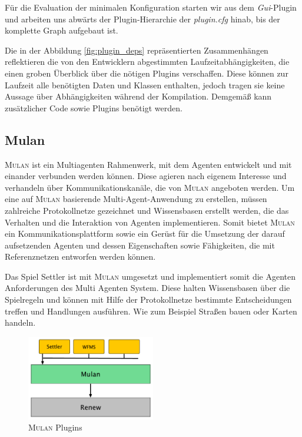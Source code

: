 	Für die Evaluation der minimalen Konfiguration starten wir aus dem \textit{Gui}-Plugin und arbeiten uns abwärts der Plugin-Hierarchie der \textit{plugin.cfg} hinab, bis der komplette Graph aufgebaut ist.\newline

	Die in der Abbildung \ref{fig:plugin_deps} repräsentierten Zusammenhängen reflektieren die von den Entwicklern abgestimmten Laufzeitabhängigkeiten, die einen groben Überblick über die nötigen Plugins verschaffen. Diese können zur Laufzeit alle benötigten Daten und Klassen enthalten, jedoch tragen sie keine Aussage über Abhängigkeiten während der Kompilation. Demgemäß kann zusätzlicher Code sowie Plugins benötigt werden. 


\subsection{Mulan} \label{sub:mulan}
	\textsc{Mulan} \cite{Roelke04} ist ein Multiagenten Rahmenwerk, mit dem Agenten entwickelt und mit einander verbunden werden können. Diese agieren nach eigenem Interesse und verhandeln über Kommunikationskanäle, die von \textsc{Mulan} angeboten werden. Um eine auf \textsc{Mulan} basierende Multi-Agent-Anwendung zu erstellen, müssen zahlreiche Protokollnetze gezeichnet und Wissensbasen erstellt werden, die das Verhalten und die Interaktion von Agenten implementieren. Somit bietet \textsc{Mulan} ein Kommunikationsplattform sowie ein Gerüst für die Umsetzung der darauf aufsetzenden Agenten und dessen Eigenschaften sowie Fähigkeiten, die mit Referenznetzen entworfen werden können. \cite{Cabac10a} \bigbreak

	Das Spiel Settler ist mit \textsc{Mulan} umgesetzt und implementiert somit die Agenten Anforderungen des Multi Agenten System. Diese halten Wissensbasen über die Spielregeln und können mit Hilfe der Protokollnetze bestimmte Entscheidungen treffen und Handlungen ausführen. Wie zum Beispiel Straßen bauen oder Karten handeln.\bigbreak
	
	\begin{figure}[h!]
	  \centering
	  \includegraphics[width=0.5\textwidth]{material/images/settler-mulan-renew.pdf}
	  \caption{\textsc{Mulan} Plugins}
	  \label{fig:mulan_plugin}
	\end{figure}

